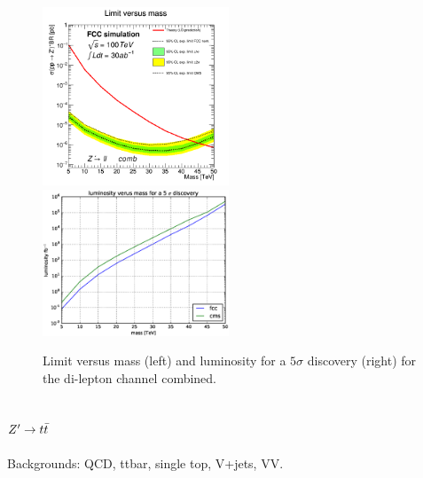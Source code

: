 \documentclass{cernrep}
\begin{document}
\begin{figure}[!htb]\centering
\includegraphics[width=0.495\textwidth]{Fig/lim_Zprime_ll_fcc_cms.png}
\includegraphics[width=0.495\textwidth]{Fig/DiscoveryPotential_ll.eps}
\caption{Limit versus mass (left) and luminosity for a $5\sigma$ discovery (right) for the
 di-lepton channel combined.}
\label{fig:zpll_lim}
\end{figure}

\subsection{$Z^{\prime} \rightarrow t\bar{t}$}
\label{subsec:Zptt}

Backgrounds: QCD, ttbar, single top, V+jets, VV. 
\end{document}
